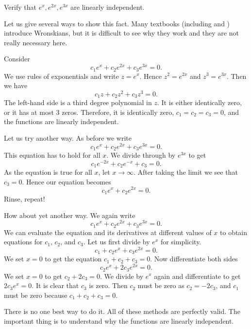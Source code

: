 \begin{example}
Verify that $e^x, e^{2x}, e^{3x}$ are linearly independent.

Let us give several ways to show this fact.
Many textbooks (including \cite{EP} and
\cite{F}) introduce Wronskians, but it is difficult to see why they work and
they are not really necessary here.

Consider
\begin{equation*}
c_1 e^x + c_2 e^{2x} + c_3 e^{3x} = 0.
\end{equation*}
We use rules of exponentials and write $z = e^x$.  Hence $z^2 = e^{2x}$
and $z^3 = e^{3x}$.  Then we have
\begin{equation*}
c_1 z + c_2 z^2 + c_3 z^3 = 0.
\end{equation*}
The left-hand side is a third degree polynomial in $z$.
It is either identically zero,
or it has at most 3 zeros.  Therefore, it is identically zero,
$c_1 = c_2 = c_3 = 0$, and the functions are linearly independent.

Let us try another way.  As before we write
\begin{equation*}
c_1 e^x + c_2 e^{2x} + c_3 e^{3x} = 0.
\end{equation*}
This equation has to hold for all $x$.  We divide through
by $e^{3x}$ to get
\begin{equation*}
c_1 e^{-2x} + c_2 e^{-x} + c_3 = 0.
\end{equation*}
As the equation is true for all $x$, let $x \to \infty$.  After taking the
limit we see that $c_3 = 0$.  Hence our equation becomes
\begin{equation*}
c_1 e^x + c_2 e^{2x} = 0.
\end{equation*}
Rinse, repeat!

How about yet another way.  We again write
\begin{equation*}
c_1 e^x + c_2 e^{2x} + c_3 e^{3x} = 0.
\end{equation*}
We can evaluate the equation and its derivatives at different
values of $x$ to obtain equations for
$c_1$, $c_2$, and $c_3$.
Let us first
divide by $e^{x}$ for simplicity.
\begin{equation*}
c_1 + c_2 e^{x} + c_3 e^{2x} = 0.
\end{equation*}
We set $x=0$ to get the equation $c_1 + c_2 + c_3 = 0$.  Now differentiate
both sides
\begin{equation*}
c_2 e^{x} + 2 c_3 e^{2x} = 0 .
\end{equation*}
We set $x=0$ to get $c_2 + 2c_3 = 0$.  We divide by $e^x$ again and
differentiate to get
$2 c_3 e^{x} = 0$.  It is clear that $c_3$ is zero.  Then $c_2$ must be
zero as $c_2 = -2c_3$, and $c_1$ must be zero because $c_1 + c_2 + c_3 = 0$.

There is no one best way to do it.  All of these methods are perfectly valid.
The important thing is to understand why the functions are linearly
independent.
\end{example}

